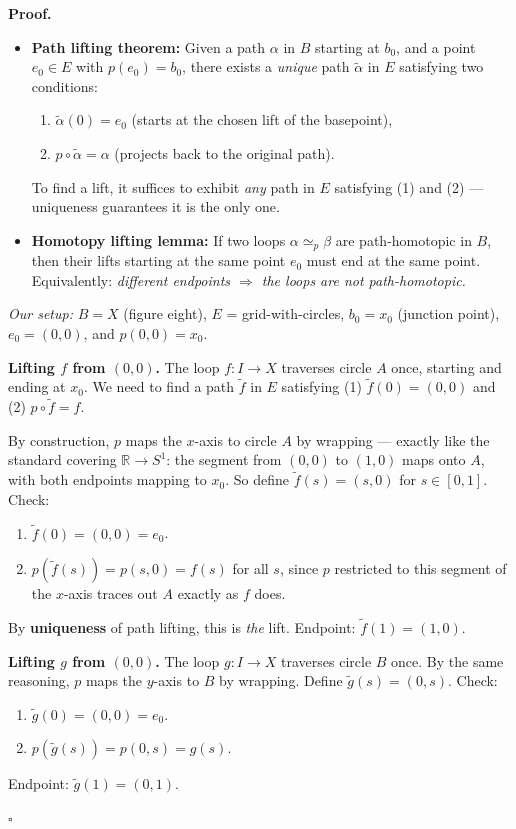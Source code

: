 \documentclass[11pt]{report}
\renewenvironment{proof}[1][Proof]{\noindent\textbf{#1.} }{\hfill$\square$\par\vspace{5pt}}
\begin{document}
\begin{proof}
\begin{itemize}[nosep]
    \item \textbf{Path lifting theorem:} Given a path $\alpha$ in $B$ starting at $b_0$, and a point $e_0 \in E$ with $p(e_0) = b_0$, there exists a \emph{unique} path $\tilde{\alpha}$ in $E$ satisfying two conditions:
    \begin{enumerate}[nosep]
        \item $\tilde{\alpha}(0) = e_0$ \quad (starts at the chosen lift of the basepoint),
        \item $p \circ \tilde{\alpha} = \alpha$ \quad (projects back to the original path).
    \end{enumerate}
    To find a lift, it suffices to exhibit \emph{any} path in $E$ satisfying (1) and (2) --- uniqueness guarantees it is the only one.
    \item \textbf{Homotopy lifting lemma:} If two loops $\alpha \simeq_p \beta$ are path-homotopic in $B$, then their lifts starting at the same point $e_0$ must end at the same point. Equivalently: \emph{different endpoints $\Rightarrow$ the loops are not path-homotopic.}
\end{itemize}

\textit{Our setup:} $B = X$ (figure eight), $E$ = grid-with-circles, $b_0 = x_0$ (junction point), $e_0 = (0,0)$, and $p(0,0) = x_0$. \checkmark

\medskip

\textbf{Lifting $f$ from $(0,0)$.} The loop $f: I \to X$ traverses circle $A$ once, starting and ending at $x_0$. We need to find a path $\tilde{f}$ in $E$ satisfying (1) $\tilde{f}(0) = (0,0)$ and (2) $p \circ \tilde{f} = f$.

By construction, $p$ maps the $x$-axis to circle $A$ by wrapping --- exactly like the standard covering $\mathbb{R} \to S^1$: the segment from $(0,0)$ to $(1,0)$ maps onto $A$, with both endpoints mapping to $x_0$. So define $\tilde{f}(s) = (s, 0)$ for $s \in [0,1]$. Check:
\begin{enumerate}[nosep]
    \item $\tilde{f}(0) = (0, 0) = e_0$. \checkmark
    \item $p(\tilde{f}(s)) = p(s, 0) = f(s)$ for all $s$, since $p$ restricted to this segment of the $x$-axis traces out $A$ exactly as $f$ does. \checkmark
\end{enumerate}
By \textbf{uniqueness} of path lifting, this is \emph{the} lift. Endpoint: $\tilde{f}(1) = (1, 0)$.

\textbf{Lifting $g$ from $(0,0)$.} The loop $g: I \to X$ traverses circle $B$ once. By the same reasoning, $p$ maps the $y$-axis to $B$ by wrapping. Define $\tilde{g}(s) = (0, s)$. Check:
\begin{enumerate}[nosep]
    \item $\tilde{g}(0) = (0, 0) = e_0$. \checkmark
    \item $p(\tilde{g}(s)) = p(0, s) = g(s)$. \checkmark
\end{enumerate}
Endpoint: $\tilde{g}(1) = (0, 1)$.


\end{proof}
\end{document}
